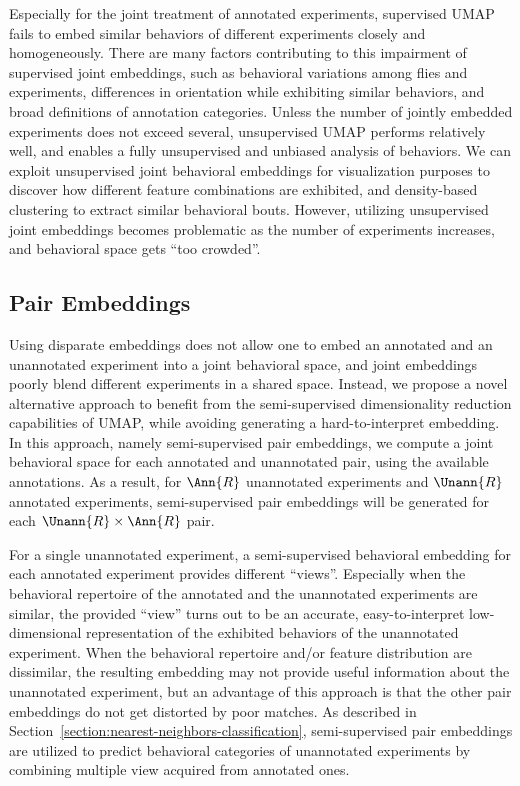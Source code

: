 Especially for the joint treatment of annotated experiments, supervised UMAP fails to embed similar behaviors of different experiments closely and homogeneously.
There are many factors contributing to this impairment of supervised joint embeddings, such as behavioral variations among flies and experiments,  differences in orientation while exhibiting similar behaviors, and broad definitions of annotation categories.
Unless the number of jointly embedded experiments does not exceed several, unsupervised UMAP performs relatively well, and enables a fully unsupervised and unbiased analysis of behaviors.
We can exploit unsupervised joint behavioral embeddings for visualization purposes to discover how different feature combinations are exhibited, and density-based clustering to extract similar behavioral bouts.
However, utilizing unsupervised joint embeddings becomes problematic as the number of experiments increases, and behavioral space gets ``too crowded''.

\subsection{Pair Embeddings}\label{section:pair-embeddings}
Using disparate embeddings does not allow one to embed an annotated and an unannotated experiment into a joint behavioral space, and joint embeddings poorly blend different experiments in a shared space.
Instead, we propose a novel alternative approach to benefit from the semi-supervised dimensionality reduction capabilities of UMAP, while avoiding generating a hard-to-interpret embedding.
In this approach, namely semi-supervised pair embeddings, we compute a joint behavioral space for each annotated and unannotated pair, using the available annotations.
As a result, for $\Ann{R}$ unannotated experiments and  $\Unann{R}$ annotated experiments, semi-supervised pair embeddings will be generated for each $\Unann{R} \times \Ann{R}$ pair.

For a single unannotated experiment, a semi-supervised behavioral embedding for each annotated experiment provides different ``views''.
Especially when the behavioral repertoire of the annotated and the unannotated experiments are similar, the provided ``view'' turns out to be an accurate, easy-to-interpret low-dimensional representation of the exhibited behaviors of the unannotated experiment.
When the behavioral repertoire and/or feature distribution are dissimilar, the resulting embedding may not provide useful information about the unannotated experiment, but an advantage of this approach is that the other pair embeddings do not get distorted by poor matches.
As described in Section~\ref{section:nearest-neighbors-classification}, semi-supervised pair embeddings are utilized to predict behavioral categories of unannotated experiments by combining multiple view acquired from annotated ones.

